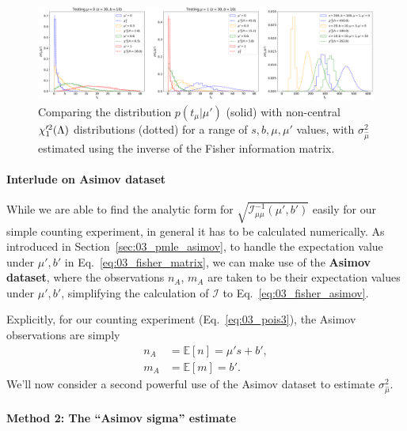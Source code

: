\begin{figure}[htb]
  \centering
  \includegraphics[width=\textwidth]{figures/03-Stats/06-asymptotic-plr/2.png}
  \caption{Comparing the distribution $p(t_\mu|\mu')$ (solid) with non-central $\chi^{\prime 2}_1(\Lambda)$ distributions (dotted) for a range of $s, b, \mu, \mu'$ values, with $\sigma^2_{\hat\mu}$ estimated using the inverse of the Fisher information matrix.}
  \label{fig:03_ptmu_asym1}
\end{figure}


\paragraph{Interlude on Asimov dataset}

While we are able to find the analytic form for $\sqrt{\mathcal I^{-1}_{\mu\mu}(\mu', b')}$ easily for our simple counting experiment, in general it has to be calculated numerically.
As introduced in Section~\ref{sec:03_pmle_asimov}, to handle the expectation value under $\mu', b'$ in Eq.~\ref{eq:03_fisher_matrix}, we can make use of the \textbf{Asimov dataset}, where the observations $n_A$, $m_A$ are taken to be their expectation values under $\mu', b'$, simplifying the calculation of $\mathcal I$ to Eq.~\ref{eq:03_fisher_asimov}.

Explicitly, for our counting experiment (Eq.~\ref{eq:03_pois3}), the Asimov observations are simply
\begin{align}
n_A &= \mathbb E[n] = \mu' s + b', \\
m_A &= \mathbb E[m] = b'.
\label{eq:03_asimov_data}
\end{align}
We'll now consider a second powerful use of the Asimov dataset to estimate $\sigma^2_{\hat\mu}$.

\paragraph{Method 2: The ``Asimov sigma'' estimate}

